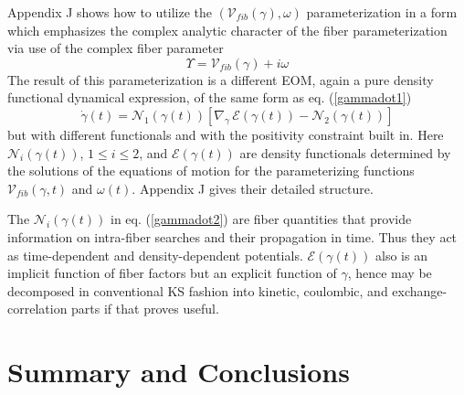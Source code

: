 \documentclass[aps,preprint]{revtex4}%
\begin{document}
Appendix J shows how to utilize the $\left(  \mathcal{V}_{fib}(\gamma
),\omega\right)  $ parameterization in a form which emphasizes the complex
analytic character of the fiber parameterization via use of the complex fiber
parameter
\begin{equation}
\Upsilon=\mathcal{V}_{fib}(\gamma)+i\omega\label{Ffactor}%
\end{equation}
The result of this parameterization is a different EOM, again a pure density
functional dynamical expression, of the same form as eq. (\ref{gammadot1})
\begin{equation}
\dot{\gamma}(t)=\mathcal{N}_{1}(\gamma(t))\left[  \nabla_{\gamma}%
\,\mathcal{E}(\gamma(t))-\mathcal{N}_{2}(\gamma(t))\right]  \label{gammadot2}%
\end{equation}
but with different functionals and with the positivity constraint built in.
Here $\mathcal{N}_{i}(\gamma(t))$, $1\leq i\leq2$, and $\mathcal{E}%
(\gamma(t))$ are density functionals determined by the solutions of the
equations of motion for the parameterizing functions $\mathcal{V}_{fib}%
(\gamma,t)$ and $\omega(t)$. Appendix J gives their detailed structure.

The $\mathcal{N}_{i}(\gamma(t))$ in eq. (\ref{gammadot2}) are fiber quantities
that provide information on intra-fiber searches and their propagation in
time. Thus they act as time-dependent and density-dependent potentials.
$\mathcal{E}(\gamma(t))$ also is an implicit function of fiber factors but an
explicit function of $\gamma$, hence may be decomposed in conventional KS
fashion into kinetic, coulombic, and exchange-correlation parts if that proves useful.

\section{Summary and Conclusions}
\end{document}
